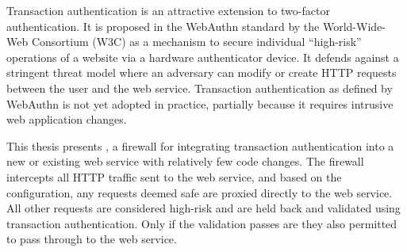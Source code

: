 % 
% 
%



Transaction authentication is an attractive extension to two-factor authentication. It is proposed in the WebAuthn standard by the World-Wide-Web Consortium (W3C) as a mechanism to secure individual ``high-risk'' operations of a website via a hardware authenticator device. It defends against a stringent threat model where an adversary can modify or create HTTP requests between the user and the web service. Transaction authentication as defined by WebAuthn is not yet adopted in practice, partially because it requires intrusive web application changes.




This thesis presents \sys{}, a firewall for integrating transaction authentication into a new or existing web service with relatively few code changes. The firewall intercepts all HTTP traffic sent to the web service, and based on the configuration, any requests deemed safe are proxied directly to the web service. All other requests are considered high-risk and are held back and validated using transaction authentication. Only if the validation passes are they also permitted to pass through to the web service.


